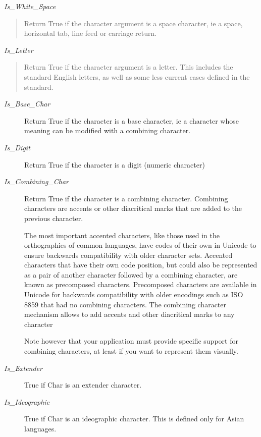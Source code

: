 \documentclass[letterpaper,10pt,english]{sphinxmanual}
\begin{document}
\emph{Is\_White\_Space}
\begin{quote}

Return True if the character argument is a space character, ie a space,
horizontal tab, line feed or carriage return.
\end{quote}

\emph{Is\_Letter}
\begin{quote}

Return True if the character argument is a letter. This includes the
standard English letters, as well as some less current cases defined in the
standard.
\end{quote}
\begin{description}
\item[{\emph{Is\_Base\_Char}}] \leavevmode
Return True if the character is a base character, ie a character whose
meaning can be modified with a combining character.

\item[{\emph{Is\_Digit}}] \leavevmode
Return True if the character is a digit (numeric character)

\item[{\emph{Is\_Combining\_Char}}] \leavevmode
Return True if the character is a combining character. Combining characters
are accents or other diacritical marks that are added to the previous
character.

The most important accented characters, like those used in the orthographies
of common languages, have codes of their own in Unicode to ensure backwards
compatibility with older character sets. Accented characters that have their
own code position, but could also be represented as a pair of another
character followed by a combining character, are known as precomposed
characters. Precomposed characters are available in Unicode for backwards
compatibility with older encodings such as ISO 8859 that had no combining
characters. The combining character mechanism allows to add accents and other
diacritical marks to any character

Note however that your application must provide specific support for
combining characters, at least if you want to represent them visually.

\item[{\emph{Is\_Extender}}] \leavevmode
True if Char is an extender character.

\item[{\emph{Is\_Ideographic}}] \leavevmode
True if Char is an ideographic character. This is defined only for
Asian languages.

\end{description}
\end{document}
